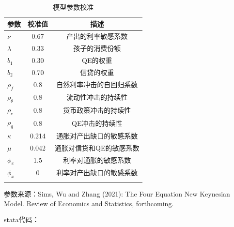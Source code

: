 \documentclass[cn,12pt,math=newtx,citestyle=gb7714-2015,bibstyle=gb7714-2015]{elegantbook}
\begin{document}
	\begin{table}[htbp]\centering
		\scriptsize
		\caption{模型参数校准}
		\label{param}
		\begin{center}
			\begin{threeparttable}
				\begin{tabular}{l*{2}{c}}
					\toprule
					\multicolumn{1}{l}{\textbf{参数}}&
					\multicolumn{1}{c}{\textbf{校准值}}&
					\multicolumn{1}{c}{描述} \\
					\midrule
					$\nu$ &0.67&产出的利率敏感系数\\
					$\lambda$              &      0.33  &孩子的消费份额     \\
					$b_1$ &   0.30   &    QE的权重   \\
					$b_2$        &     0.70 &信贷的权重      \\
					$\rho_f$ & 0.8 & 自然利率冲击的自回归系数  \\
					$\rho_\theta$ & 0.8 & 流动性冲击的持续性  \\
					$\rho_e$ & 0.8 & 货币政策冲击的持续性  \\
					$\rho_q$ & 0.8 & QE冲击的持续性  \\
					$\kappa$ & 0.214 & 通胀对产出缺口的敏感系数  \\
					$\mu$ & 0.042& 通胀对信贷和QE的敏感系数  \\
					$\phi_\pi$ & 1.5 & 利率对通胀的敏感系数  \\
					$\phi_x$ & 0 & 利率对产出缺口的敏感系数  \\
					
					\\
					\bottomrule
				\end{tabular}
				\begin{tablenotes}
					\tiny
					\item 参数来源：Sims, Wu and Zhang (2021): The Four Equation New Keynesian Model. Review of Economics and Statistics, forthcoming.
				\end{tablenotes}
			\end{threeparttable}
		\end{center}
	\end{table}
	
	stata代码：
	
\end{document}

